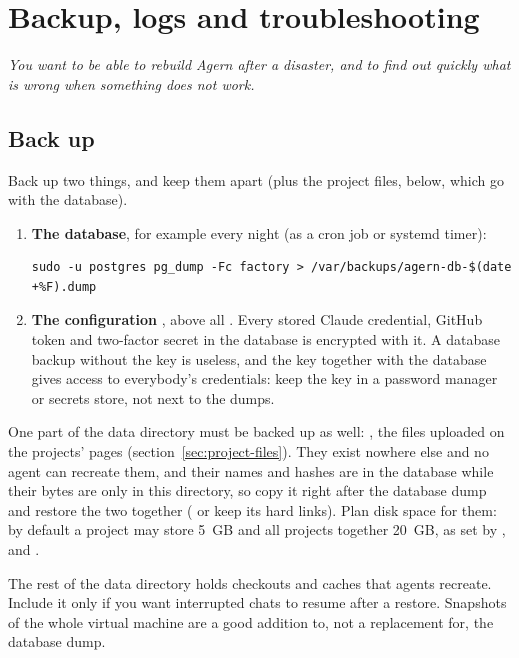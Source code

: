 \chapter{Backup, logs and troubleshooting}\label{ch:backup}

\emph{You want to be able to rebuild Agern after a disaster, and to find out quickly what is wrong
when something does not work.}

\section{Back up}\label{sec:backup}

Back up two things, and keep them apart (plus the project files, below, which go with the database).

\begin{enumerate}
  \item \textbf{The database}, for example every night (as a cron job or systemd timer):
\begin{lstlisting}
sudo -u postgres pg_dump -Fc factory > /var/backups/agern-db-$(date +%F).dump
\end{lstlisting}
  \item \textbf{The configuration} , above all .
    Every stored Claude credential, GitHub token and two-factor secret in the database is encrypted
    with it. A database backup without the key is useless, and the key together with the database
    gives access to everybody's credentials: keep the key in a password manager or secrets store, not
    next to the dumps.
\end{enumerate}

One part of the data directory must be backed up as well: , the
files uploaded on the projects'  pages (section~\ref{sec:project-files}). They exist
nowhere else and no agent can recreate them, and their names and hashes are in the database while
their bytes are only in this directory, so copy it right after the database dump and restore the
two together ( or  keep its hard links). Plan disk space for them: by
default a project may store 5~GB and all projects together 20~GB, as set by
,  and
.

The rest of the data directory  holds checkouts and caches that agents
recreate. Include it only if you want interrupted chats to resume after a restore. Snapshots of the whole virtual
machine are a good addition to, not a replacement for, the database dump.

